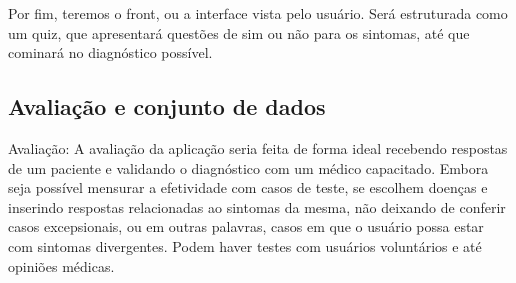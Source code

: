 Por fim, teremos o front, ou a interface vista pelo usuário. Será estruturada como um quiz, que apresentará questões de sim ou não para os sintomas, até que cominará no diagnóstico possível.


\subsection{Avaliação e conjunto de dados}

Avaliação: A avaliação da aplicação seria feita de forma ideal recebendo respostas de um paciente e validando o diagnóstico com um médico capacitado. Embora seja possível mensurar a efetividade com casos de teste, se escolhem doenças e inserindo respostas relacionadas ao sintomas da mesma, não deixando de conferir casos excepsionais, ou  em outras palavras, casos em que o usuário possa estar com sintomas divergentes.
Podem haver testes com usuários voluntários e até opiniões médicas.


